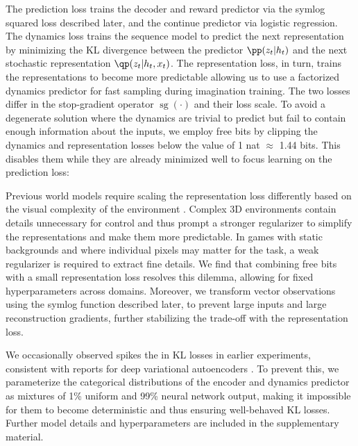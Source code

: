 
The prediction loss trains the decoder and reward predictor via the symlog squared loss described later, and the continue predictor via logistic regression.
The dynamics loss trains the sequence model to predict the next representation by minimizing the KL divergence between the predictor $\pp(z_t|h_t)$ and the next stochastic representation $\qp(z_t|h_t,x_t)$.
The representation loss, in turn, trains the representations to become more predictable allowing us to use a factorized dynamics predictor for fast sampling during imagination training.
The two losses differ in the stop-gradient operator $\operatorname{sg}(\cdot)$ and their loss scale.
To avoid a degenerate solution where the dynamics are trivial to predict but fail to contain enough information about the inputs, we employ free bits\citep{kingma2016freebits} by clipping the dynamics and representation losses below the value of 1 nat $\approx$ 1.44 bits.
This disables them while they are already minimized well to focus learning on the prediction loss:


Previous world models require scaling the representation loss differently based on the visual complexity of the environment \citep{hafner2019dreamer}.
Complex 3D environments contain details unnecessary for control and thus prompt a stronger regularizer to simplify the representations and make them more predictable.
In games with static backgrounds and where individual pixels may matter for the task, a weak regularizer is required to extract fine details.
We find that combining free bits with a small representation loss resolves this dilemma, allowing for fixed hyperparameters across domains.
Moreover, we transform vector observations using the symlog function described later, to prevent large inputs and large reconstruction gradients, further stabilizing the trade-off with the representation loss.

We occasionally observed spikes the in KL losses in earlier experiments, consistent with reports for deep variational autoencoders \citep{child2020vdvae}.
To prevent this, we parameterize the categorical distributions of the encoder and dynamics predictor as mixtures of 1\% uniform and 99\% neural network output, making it impossible for them to become deterministic and thus ensuring well-behaved KL losses.
Further model details and hyperparameters are included in the supplementary material.

